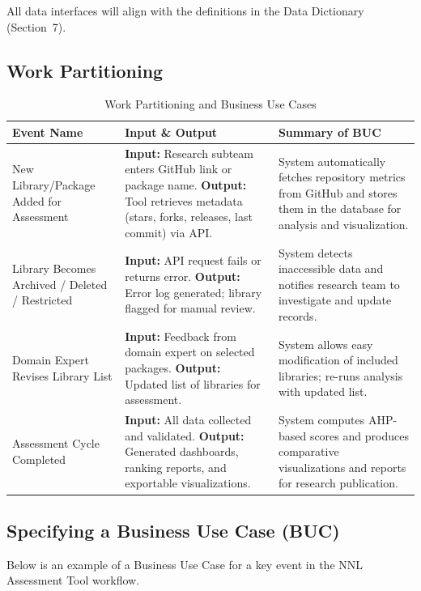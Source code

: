 \documentclass[12pt]{article}
\begin{document}
All data interfaces will align with the definitions in the Data Dictionary (Section~7).

\subsection{Work Partitioning}
\begin{table}[H]
\centering
\caption{Work Partitioning and Business Use Cases}
\begin{tabularx}{\textwidth}{|p{3.5cm}|X|X|}
\hline
\textbf{Event Name} & \textbf{Input \& Output} & \textbf{Summary of BUC} \\ \hline

New Library/Package Added for Assessment &
\textbf{Input:} Research subteam enters GitHub link or package name.  
\textbf{Output:} Tool retrieves metadata (stars, forks, releases, last commit) via API. &
System automatically fetches repository metrics from GitHub and stores them in the database for analysis and visualization. \\ \hline

Library Becomes Archived / Deleted / Restricted &
\textbf{Input:} API request fails or returns error.  
\textbf{Output:} Error log generated; library flagged for manual review. &
System detects inaccessible data and notifies research team to investigate and update records. \\ \hline

Domain Expert Revises Library List &
\textbf{Input:} Feedback from domain expert on selected packages.  
\textbf{Output:} Updated list of libraries for assessment. &
System allows easy modification of included libraries; re-runs analysis with updated list. \\ \hline

Assessment Cycle Completed &
\textbf{Input:} All data collected and validated.  
\textbf{Output:} Generated dashboards, ranking reports, and exportable visualizations. &
System computes AHP-based scores and produces comparative visualizations and reports for research publication. \\ \hline

\end{tabularx}
\end{table}

\subsection{Specifying a Business Use Case (BUC)}
Below is an example of a Business Use Case for a key event in the NNL Assessment Tool workflow.
\end{document}
